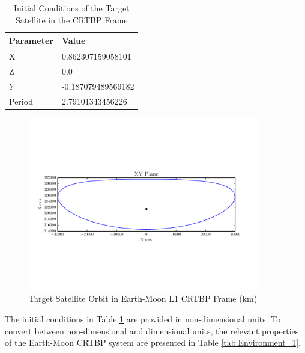 \documentclass[a4paper]{article}
\begin{document}
\begin{table}[h] 
	\begin{center}
		\begin{tabular}{l l}
			\toprule
			Parameter   & Value \\
			\midrule
			X                & 0.862307159058101 \\
			Z                & 0.0 \\
			\(\dot{Y}\)      & -0.187079489569182 \\
			Period           & 2.79101343456226 \\
			\bottomrule
		\end{tabular}
		\caption{Initial Conditions of the Target Satellite in the CRTBP Frame}
		\label{tab:IC_1}
	\end{center}
\end{table}

\begin{figure}[h]
	\begin{center}
		\includegraphics[width=0.9\textwidth]{Target_Full_Orbit_1}
		\caption{Target Satellite Orbit in Earth-Moon L1 CRTBP Frame (km)}
		\label{fig:FullOrbit_1}
	\end{center}
\end{figure}

The initial conditions in Table \ref{tab:IC_1} are provided in non-dimensional units.  To convert between non-dimensional and dimensional units, the relevant properties of the Earth-Moon CRTBP system are presented in Table \ref{tab:Environment_1}.
\end{document}
